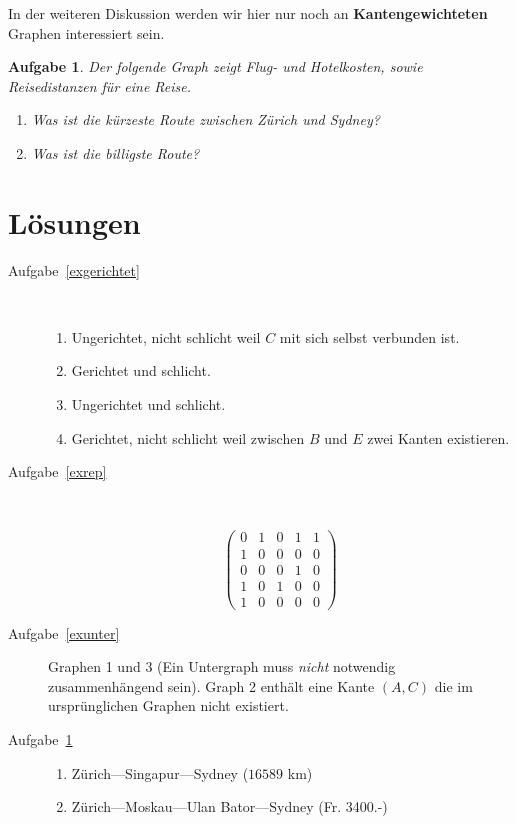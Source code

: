 \documentclass[12pt,a4paper]{report}
\theoremstyle{break}
\newtheorem{exercise}{Aufgabe}[section]
\theoremstyle{plain}
\newcommand{\algostep}[2]{\parbox{4cm}{\scalebox{0.5}{\texttt{[image: \#1]}}}
  \hfill
  \parbox{7cm}{#2}
}
\begin{document}
 In der weiteren Diskussion werden wir hier nur noch an \textbf{Kantengewichteten} Graphen interessiert sein.

\begin{exercise}\label{extravel}
Der folgende Graph zeigt Flug- und Hotelkosten, sowie Reisedistanzen
f\"{u}r eine Reise.


\begin{enumerate}
\item Was ist die \emph{k\"{u}rzeste} Route zwischen Z\"{u}rich und
    Sydney?
\item Was ist die \emph{billigste} Route?
\end{enumerate}
\end{exercise}

\newpage
\section{L\"{o}sungen}

\begin{description}
\item[Aufgabe~\ref{exgerichtet}] \hfill \\[0cm]
\begin{enumerate}
\item Ungerichtet, nicht schlicht weil $C$
  mit sich selbst verbunden ist. 
\item Gerichtet und schlicht. 
\item Ungerichtet
  und schlicht. 
\item Gerichtet, nicht schlicht weil zwischen $B$ und $E$
  zwei Kanten existieren.
\end{enumerate}
\item[Aufgabe~\ref{exrep}] \hfill \\[0cm]
\algostep{Exrep.pdf}{
\begin{displaymath}
\left( 
\begin{array}{ccccc}
0 & 1 & 0 & 1 & 1 \\
1 & 0 & 0 & 0 & 0 \\
0 & 0 & 0 & 1 & 0 \\
1 & 0 & 1 & 0 & 0 \\
1 & 0 & 0 & 0 & 0 
\end{array}
\right)
\end{displaymath}}
\item[Aufgabe~\ref{exunter}] Graphen 1 und 3 (Ein Untergraph muss
  \emph{nicht} notwendig zusammenh\"{a}ngend sein). Graph 2
  enth\"{a}lt eine Kante $(A,C)$ die im urspr\"{u}nglichen Graphen
  nicht existiert. 
\item[Aufgabe~\ref{extravel}]\hfill\linebreak
\begin{enumerate}
\item Z\"{u}rich---Singapur---Sydney ($16589$ km)
\item Z\"{u}rich---Moskau---Ulan Bator---Sydney (Fr. 3400.-)
\end{enumerate}
\end{description}
\end{document}
